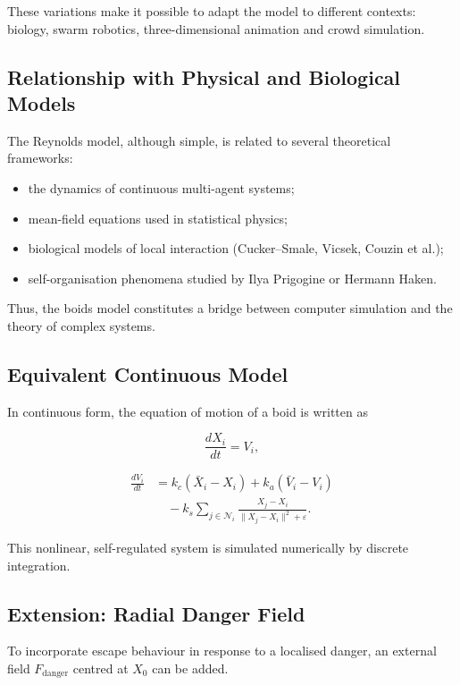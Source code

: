 \documentclass[10pt,a4paper]{article}
\begin{document}
These variations make it possible to adapt
the model to different contexts:
biology, swarm robotics, three-dimensional
animation and crowd simulation.

\subsection{Relationship with Physical and
Biological Models}

The Reynolds model, although simple, is related
to several theoretical frameworks:

\begin{itemize}
    \item the dynamics of continuous multi-agent systems;
    \item mean-field equations used in statistical physics;
    \item biological models of local interaction
    (Cucker--Smale, Vicsek, Couzin et al.);
    \item self-organisation phenomena studied
    by Ilya Prigogine or Hermann Haken.
\end{itemize}

Thus, the boids model constitutes a bridge
between computer simulation and the theory
of complex systems.

\subsection{Equivalent Continuous Model}

In continuous form, the equation of motion
of a boid is written as

\[
\frac{dX_i}{dt}=V_i,
\]

\[
\begin{aligned}
\frac{dV_i}{dt}
&=
k_c(\bar X_i-X_i)
+k_a(\bar V_i-V_i)\\
&\quad
-k_s\sum_{j\in\mathcal N_i}
\frac{X_j-X_i}
{\|X_j-X_i\|^2+\varepsilon}.
\end{aligned}
\]

This nonlinear, self-regulated system
is simulated numerically by discrete integration.

\subsection{Extension: Radial Danger Field}

To incorporate escape behaviour in response
to a localised danger, an external field
$F_{\mathrm{danger}}$ centred at $X_0$
can be added.
\end{document}

